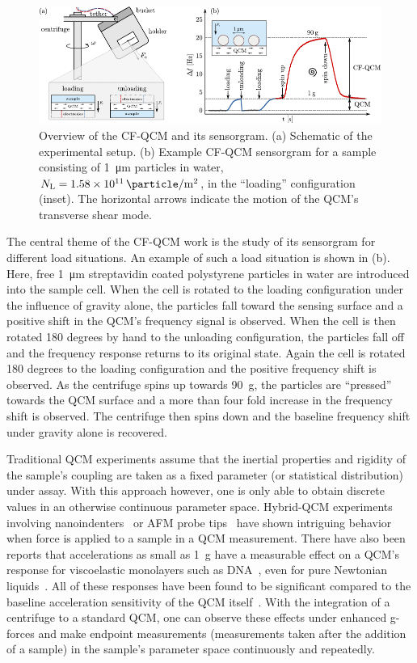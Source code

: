 \begin{figure}[ht]
\centering
\includegraphics[width=16cm,keepaspectratio]{qcm/figures/figure1.pdf}
\caption{Overview of the CF-QCM and its sensorgram.  (a) Schematic of the
experimental setup.  (b) Example CF-QCM sensorgram
for a sample consisting of \SI{1}{\micro\meter} particles in water,
$N_\mathrm{L}=\SI{1.58e11}{\particle\per\meter\squared}$, in the
``loading'' configuration (inset).  The horizontal arrows indicate the
motion of the QCM's transverse shear mode.  }
\label{fig:expsetup}
\end{figure}
The central theme of the CF-QCM work is the study of its sensorgram for
different load situations.  An example of such a load situation is shown in
(b).  Here, free \SI{1}{\micro\meter} streptavidin
coated polystyrene particles in water are introduced into the sample cell.
When the cell is rotated to the loading configuration under the influence
of gravity alone, the particles fall toward the sensing surface and a
positive shift in the QCM's frequency signal is observed.  When the cell is
then rotated 180 degrees by hand to the unloading configuration, the
particles fall off and the frequency response returns to its original
state.  Again the cell is rotated 180 degrees to the loading configuration
and the positive frequency shift is observed.  As the centrifuge spins up
towards \SI{90}{g}, the particles are ``pressed'' towards the QCM surface
and a more than four fold increase in the frequency shift is observed.  The
centrifuge then spins down and the baseline frequency shift under gravity
alone is recovered.

Traditional QCM experiments assume that the inertial properties and
rigidity of the sample's coupling are taken as a fixed parameter (or
statistical distribution) under assay.  With this approach however, one is
only able to obtain discrete values in an otherwise continuous parameter
space.  Hybrid-QCM experiments involving
nanoindenters~\cite{borovsky2001measuring} or AFM probe
tips~\cite{richter2003pathways} have shown intriguing behavior when force
is applied to a sample in a QCM measurement.  There have also been reports
that accelerations as small as \SI{1}{g} have a measurable effect on a
QCM's response for viscoelastic monolayers such as
DNA~\cite{fawcett2004evidence}, even for pure Newtonian
liquids~\cite{yoshimoto2002effect}.  All of these responses have been found
to be significant compared to the baseline acceleration sensitivity of the
QCM itself~\cite{filler1988acceleration}.  With the integration of a
centrifuge to a standard QCM, one can observe these effects under enhanced
g-forces and make endpoint measurements (measurements taken after the
addition of a sample) in the sample's parameter space continuously and
repeatedly.

